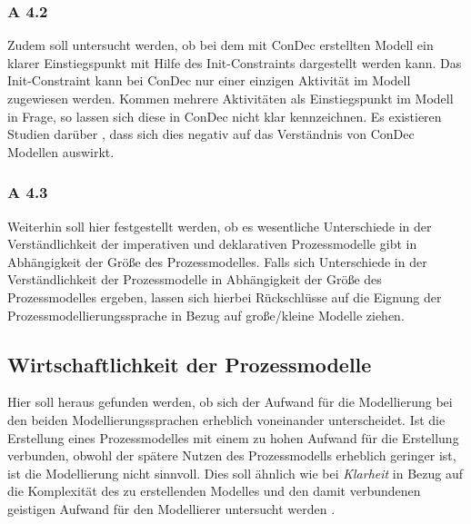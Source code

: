\subsubsection{A 4.2}
Zudem soll untersucht werden, ob bei dem mit ConDec erstellten Modell ein klarer Einstiegspunkt mit Hilfe des Init-Constraints dargestellt werden kann. Das Init-Constraint kann bei ConDec nur einer einzigen Aktivität im Modell zugewiesen werden. Kommen mehrere Aktivitäten als Einstiegspunkt im Modell in Frage, so lassen sich diese in ConDec nicht klar kennzeichnen. Es existieren Studien darüber \cite{haisjackl2014understanding, sabrina933}, dass sich dies negativ auf das Verständnis von ConDec Modellen auswirkt. \newline

\subsubsection{A 4.3}
Weiterhin soll hier festgestellt werden, ob es wesentliche Unterschiede in der Verständlichkeit der imperativen und deklarativen Prozessmodelle gibt in Abhängigkeit der Größe des Prozessmodelles. Falls sich Unterschiede in der Verständlichkeit der Prozessmodelle in Abhängigkeit der Größe des Prozessmodelles ergeben, lassen sich hierbei Rückschlüsse auf die Eignung der Prozessmodellierungssprache in Bezug auf große/kleine Modelle ziehen.

\subsection{Wirtschaftlichkeit der Prozessmodelle}

Hier soll heraus gefunden werden, ob sich der Aufwand für die Modellierung bei den beiden Modellierungssprachen erheblich voneinander unterscheidet. Ist die Erstellung eines Prozessmodelles mit einem zu hohen Aufwand für die Erstellung verbunden, obwohl der spätere Nutzen des Prozessmodells erheblich geringer ist, ist die Modellierung nicht sinnvoll. Dies soll ähnlich wie bei \textit{Klarheit} in Bezug auf die Komplexität des zu erstellenden Modelles und den damit verbundenen geistigen Aufwand für den Modellierer untersucht werden \cite{freund2007, journals95, leimeister2012,mendling2010seven}.\newline

